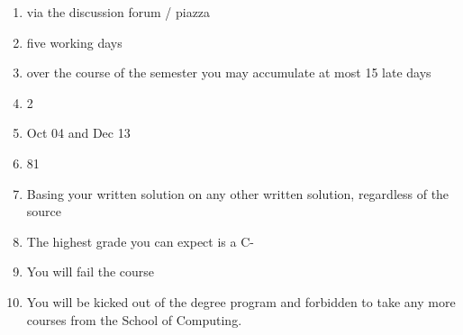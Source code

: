 \documentclass[11pt]{article}
\begin{document}
\begin{enumerate}
    \item via the discussion forum / piazza
    \item five working days
    \item over the course of the semester you may accumulate at most 15 late days
    \item 2
    \item Oct 04 and Dec 13
    \item 81
    \item Basing your written solution on any other written solution, regardless of the source
    \item The highest grade you can expect is a C-
    \item You will fail the course
    \item You will be kicked out of the degree program and forbidden to take any more courses from the School of Computing.
\end{enumerate}
\end{document}

